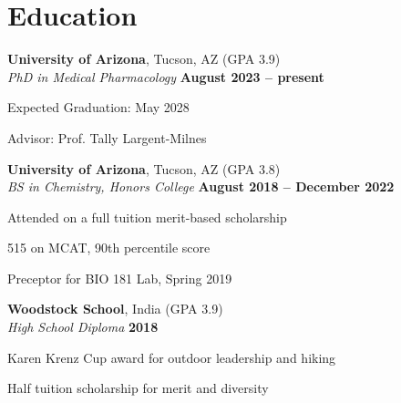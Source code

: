 \section{\mysidestyle Education}
\textbf{University of Arizona}, Tucson, AZ (GPA 3.9)\vspace{1mm}\\%
\textsl{PhD in Medical Pharmacology} \hfill \textbf{August 2023 -- present}\vspace{-3mm}\\\vspace{-1mm}%
\begin{list2}
        \item Expected Graduation: May 2028
        \item Advisor: Prof. Tally Largent-Milnes
\end{list2}

\textbf{University of Arizona}, Tucson, AZ (GPA 3.8) \vspace{1mm}\\%
\textsl{BS in Chemistry, Honors College} \hfill \textbf{August 2018 -- December 2022}\vspace{-3mm}\\\vspace{-1mm}%
\begin{list2}
        \item Attended on a full tuition merit-based scholarship
        \item 515 on MCAT, 90th percentile score
        \item Preceptor for BIO 181 Lab, Spring 2019
\end{list2}

\textbf{Woodstock School}, India (GPA 3.9) \vspace{1mm}\\%
\textsl{High School Diploma} \hfill \textbf{2018}\vspace{-3mm}\\\vspace{-1mm}%
\begin{list2}
        \item Karen Krenz Cup award for outdoor leadership and hiking
        \item Half tuition scholarship for merit and diversity
\end{list2}
